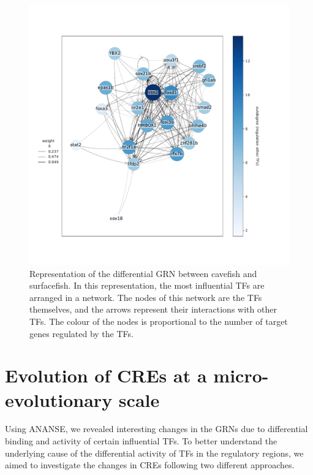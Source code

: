 \begin{figure}[hp!]
\centering
\includegraphics[width=1\textwidth]{Figures/astyanax/topTF_GRN_24hpf_cave2surface}
\caption[ANANSE networks]{Representation of the differential GRN between cavefish and surfacefish. In this representation, the most influential TFs are arranged in a network. The nodes of this network are the TFs themselves, and the arrows represent their interactions with other TFs. The colour of the nodes is proportional to the number of target genes regulated by the TFs.}
\label{fig:Ananse_networks_network}
\end{figure}




\section{Evolution of CREs at a micro-evolutionary scale}

Using ANANSE, we revealed interesting changes in the GRNs due to differential binding and activity of certain influential TFs. To better understand the underlying cause of the differential activity of TFs in the regulatory regions, we aimed to investigate the changes in CREs following two different approaches. 


